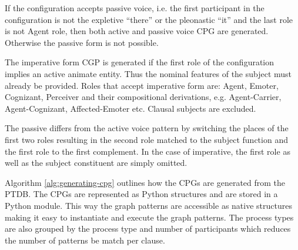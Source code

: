     
    If the configuration accepts passive voice, i.e. the first participant in the configuration is not the expletive ``there'' or the pleonastic ``it'' and the last role is not Agent role, then both active and passive voice CPG are generated. Otherwise the passive form is not possible. 

    The imperative form CGP is generated if the first role of the configuration implies an active animate entity. Thus the nominal features of the subject must already be provided. Roles that accept imperative form are: Agent, Emoter, Cognizant, Perceiver and their compositional derivations, e.g. Agent-Carrier, Agent-Cognizant, Affected-Emoter etc. Clausal subjects are excluded. 

    The passive differs from the active voice pattern by switching the places of the first two roles resulting in the second role matched to the subject function and the first role to the first complement. In the case of imperative, the first role  as well as the subject constituent are simply omitted.  

    Algorithm \ref{alg:generating-cpg} outlines how the CPGs are generated from the PTDB. The CPGs are represented as Python structures and are stored in a Python module. This way the graph patterns are accessible as native structures making it easy to instantiate and execute the graph patterns. The process types are also grouped by the process type and number of participants which reduces the number of patterns be match per clause.  

